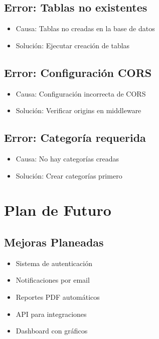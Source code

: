 \documentclass[12pt, a4paper, oneside]{article}
\begin{document}
\subsection{Error: Tablas no existentes}
\begin{itemize}
    \item Causa: Tablas no creadas en la base de datos
    \item Solución: Ejecutar creación de tablas
\end{itemize}

\subsection{Error: Configuración CORS}
\begin{itemize}
    \item Causa: Configuración incorrecta de CORS
    \item Solución: Verificar origins en middleware
\end{itemize}

\subsection{Error: Categoría requerida}
\begin{itemize}
    \item Causa: No hay categorías creadas
    \item Solución: Crear categorías primero
\end{itemize}

\section{Plan de Futuro}

\subsection{Mejoras Planeadas}
\begin{itemize}
    \item Sistema de autenticación
    \item Notificaciones por email
    \item Reportes PDF automáticos
    \item API para integraciones
    \item Dashboard con gráficos
\end{itemize}
\end{document}
